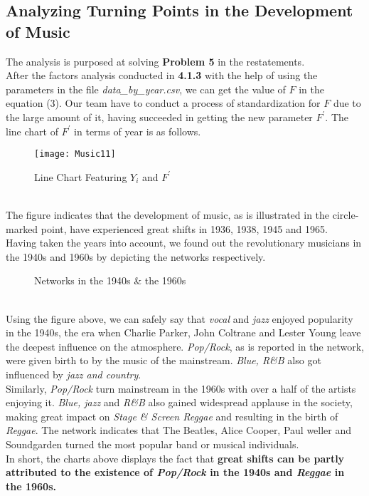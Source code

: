 \documentclass[12pt]{article}
\begin{document}
{{\subsection{Analyzing Turning Points in the Development of Music}
The analysis is purposed at solving \textbf{Problem 5} in the restatements.\\[2ex]
After the factors analysis conducted in {\textbf{4.1.3}} with the help of using the parameters in the file {\textit{data\_by\_year.csv}}, we can get the value of $F$ in the equation (3).
Our team have to conduct a process of standardization for $F$ due to the large amount of it, having succeeded in getting the new parameter $F^{'}$. The line chart of $F^{'}$ in terms of year is as follows.
\begin{figure}[h]
\centering
	\texttt{[image: Music11]}
	\caption{Line Chart Featuring $Y_i$ and $F^{'}$}
\end{figure}\\[2ex]
The figure indicates that the development of music, as is illustrated in the circle-marked point, have experienced great shifts in 1936, 1938, 1945 and 1965.\\[2ex]
Having taken the years into account, we found out the revolutionary musicians in the 1940s and 1960s by depicting the networks respectively.
\begin{figure}[htbp]
\centering
\begin{subfigure}[The 1940s]{
	\texttt{[image: Music12]}
}
\end{subfigure}
\hspace{1.8cm}
\begin{subfigure}[The 1960s]
{\texttt{[image: Music13]}}	
\end{subfigure}
\caption{Networks in the 1940s \& the 1960s}
\end{figure}\\[2ex]
Using the figure above, we can safely say that \textit{vocal} and \textit{jazz} enjoyed popularity in the 1940s, the era when Charlie Parker, John Coltrane and Lester Young leave the deepest influence on the atmosphere. \textit{Pop/Rock}, as is reported in the network, were given birth to by the music of the mainstream. \textit{Blue, R\&B} also got influenced by \textit{jazz and country}.\\[2ex]
Similarly, \textit{Pop/Rock} turn mainstream in the 1960s with over a half of the artists enjoying it. \textit{Blue, jazz} and \textit{R\&B} also gained widespread applause in the society, making great impact on \textit{Stage \& Screen Reggae} and resulting in the birth of \textit{Reggae}. The network indicates that The Beatles, Alice Cooper, Paul weller and Soundgarden turned the most popular band or musical individuals.\\[2ex]
In short, the charts above displays the fact that \textbf{great shifts can be partly attributed to the existence of \textit{Pop/Rock} in the 1940s and \textit{Reggae} in the 1960s.}
}}
\end{document}

